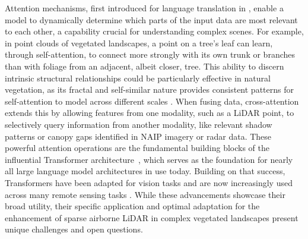 \documentclass[12pt]{report}
\begin{document}
Attention mechanisms, first introduced for language translation in \cite{bahdanau2014neural}, enable a model to dynamically determine which parts of the input data are most relevant to each other, a capability crucial for understanding complex scenes. For example, in point clouds of vegetated landscapes, a point on a tree’s leaf can learn, through self-attention, to connect more strongly with its own trunk or branches than with foliage from an adjacent, albeit closer, tree. This ability to discern intrinsic structural relationships could be particularly effective in natural vegetation, as its fractal and self-similar nature provides consistent patterns for self-attention to model across different scales \cite{scheuring1994application, yang2015extraction}. When fusing data, cross-attention extends this by allowing features from one modality, such as a LiDAR point, to selectively query information from another modality, like relevant shadow patterns or canopy gaps identified in NAIP imagery or radar data. These powerful attention operations are the fundamental building blocks of the influential Transformer architecture~\cite{vaswani2017attention}, which serves as the foundation for nearly all large language model architectures in use today. Building on that success, Transformers have been adapted for vision tasks \cite{dosovitskiy2020image} and are now increasingly used across many remote sensing tasks \cite{aleissaee2023transformers}. While these advancements showcase their broad utility, their specific application and optimal adaptation for the enhancement of sparse airborne LiDAR in complex vegetated landscapes present unique challenges and open questions.
\end{document}
